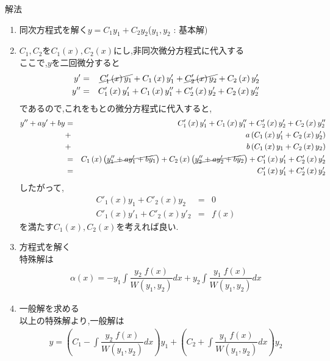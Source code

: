 \documentclass[a4paper]{jsarticle}
\begin{document}
\begin{itembox}[l]{解法}
    \begin{enumerate}[(1)]
        \item 同次方程式を解く\quad $y=C_1y_1+C_2y_2$\quad($y_1,y_2$ : 基本解)
        \item $C_1,C_2$を$C_1\left(x\right),C_2\left(x\right)$にし,非同次微分方程式に代入する\\
              ここで,$y$を二回微分すると
              \begin{eqnarray*}
                  y'&=&\cancel{C'_1\left(x\right)y_1}+C_1\left(x\right)y'_1+\cancel{C'_2\left(x\right)y_2}+C_2\left(x\right)y'_2\\
                  y''&=&C'_1\left(x\right)y'_1+C_1\left(x\right)y''_1+C'_2\left(x\right)y'_2+C_2\left(x\right)y''_2
              \end{eqnarray*}
              であるので,これをもとの微分方程式に代入すると,
              \begin{eqnarray*}
                  y''+ay'+by&=&C'_1\left(x\right)y'_1+C_1\left(x\right)y''_1+C'_2\left(x\right)y'_2+C_2\left(x\right)y''_2\\
                  &+&a\left(C_1\left(x\right)y'_1+C_2\left(x\right)y'_2\right)\\
                  &+&b\left(C_1\left(x\right)y_1+C_2\left(x\right)y_2\right)\\
                  &=&C_1\left(x\right)\left(\cancel{y''_1+ay'_1+by_1}\right)+C_2\left(x\right)\left(\cancel{y''_2+ay'_2+by_2}\right)+C'_1\left(x\right)y'_1+C'_2\left(x\right)y'_2\\
                  &=&C'_1\left(x\right)y'_1+C'_2\left(x\right)y'_2
              \end{eqnarray*}
              したがって,
              \begin{eqnarray*}
                  C'_1\left(x\right)y_1+C'_2\left(x\right)y_2&=&0\\
                  C'_1\left(x\right)y'_1+C'_2\left(x\right)y'_2&=&f\left(x\right)
              \end{eqnarray*}
              を満たす$C_1\left(x\right),C_2\left(x\right)$を考えれば良い.
        \item 方程式を解く\\
              特殊解は
              \begin{eqnarray*}
                  \alpha\left(x\right)=-y_1\int\dfrac{y_2\;f\left(x\right)}{W\left(y_1,y_2\right)}dx+y_2\int\dfrac{y_1\;f\left(x\right)}{W\left(y_1,y_2\right)}dx
              \end{eqnarray*}
        \item 一般解を求める\\
              以上の特殊解より,一般解は
              \begin{eqnarray*}
                  y=\left(C_1-\int\dfrac{y_2\;f\left(x\right)}{W\left(y_1,y_2\right)}dx\right)y_1+\left(C_2+\int\dfrac{y_1\;f\left(x\right)}{W\left(y_1,y_2\right)}dx\right)y_2
              \end{eqnarray*}
    \end{enumerate}
\end{itembox}
\end{document}
